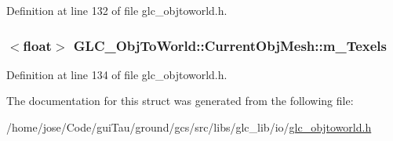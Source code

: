 Definition at line 132 of file glc\-\_\-objtoworld.\-h.

\hypertarget{struct_g_l_c___obj_to_world_1_1_current_obj_mesh_a8a7ddd5879c2f6b4d32001297611e159}{
\subsubsection[{m\-\_\-\-Texels}]{$<${\bf float}$>$ G\-L\-C\-\_\-\-Obj\-To\-World\-::\-Current\-Obj\-Mesh\-::m\-\_\-\-Texels}}\label{struct_g_l_c___obj_to_world_1_1_current_obj_mesh_a8a7ddd5879c2f6b4d32001297611e159}


Definition at line 134 of file glc\-\_\-objtoworld.\-h.



The documentation for this struct was generated from the following file\-:\begin{DoxyCompactItemize}
\item 
/home/jose/\-Code/gui\-Tau/ground/gcs/src/libs/glc\-\_\-lib/io/\hyperlink{glc__objtoworld_8h}{glc\-\_\-objtoworld.\-h}\end{DoxyCompactItemize}
